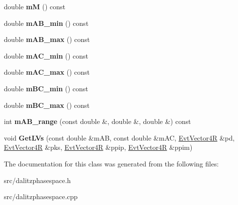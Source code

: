 \begin{DoxyCompactItemize}
\item 
\hypertarget{class_dalitz_phase_space_a0215d24ab200f3c2363610f3d63f05c8}{}double {\bfseries m\+M} () const \label{class_dalitz_phase_space_a0215d24ab200f3c2363610f3d63f05c8}

\item 
\hypertarget{class_dalitz_phase_space_af485aa6eb857562c196c0e4fa8a079fc}{}double {\bfseries m\+A\+B\+\_\+min} () const \label{class_dalitz_phase_space_af485aa6eb857562c196c0e4fa8a079fc}

\item 
\hypertarget{class_dalitz_phase_space_aa42739ae0b06d176a7b50a183da1ccc3}{}double {\bfseries m\+A\+B\+\_\+max} () const \label{class_dalitz_phase_space_aa42739ae0b06d176a7b50a183da1ccc3}

\item 
\hypertarget{class_dalitz_phase_space_a0fa5183d3bb816f7e1fcc88e250af2e6}{}double {\bfseries m\+A\+C\+\_\+min} () const \label{class_dalitz_phase_space_a0fa5183d3bb816f7e1fcc88e250af2e6}

\item 
\hypertarget{class_dalitz_phase_space_a94ab5f0e70424deeebb6abcf90ef5410}{}double {\bfseries m\+A\+C\+\_\+max} () const \label{class_dalitz_phase_space_a94ab5f0e70424deeebb6abcf90ef5410}

\item 
\hypertarget{class_dalitz_phase_space_a9f5799fca694bdb165e1bf2588e06b69}{}double {\bfseries m\+B\+C\+\_\+min} () const \label{class_dalitz_phase_space_a9f5799fca694bdb165e1bf2588e06b69}

\item 
\hypertarget{class_dalitz_phase_space_ab744b5d45f3d3f0235fc2edce690fad6}{}double {\bfseries m\+B\+C\+\_\+max} () const \label{class_dalitz_phase_space_ab744b5d45f3d3f0235fc2edce690fad6}

\item 
\hypertarget{class_dalitz_phase_space_ae9e9b117030d7eca0551c214c761aaf3}{}int {\bfseries m\+A\+B\+\_\+range} (const double \&, double \&, double \&) const \label{class_dalitz_phase_space_ae9e9b117030d7eca0551c214c761aaf3}

\item 
\hypertarget{class_dalitz_phase_space_a86cfd847b2eeb2563262723bbd21392a}{}void {\bfseries Get\+L\+Vs} (const double \&m\+A\+B, const double \&m\+A\+C, \hyperlink{class_evt_vector4_r}{Evt\+Vector4\+R} \&pd, \hyperlink{class_evt_vector4_r}{Evt\+Vector4\+R} \&pks, \hyperlink{class_evt_vector4_r}{Evt\+Vector4\+R} \&ppip, \hyperlink{class_evt_vector4_r}{Evt\+Vector4\+R} \&ppim)\label{class_dalitz_phase_space_a86cfd847b2eeb2563262723bbd21392a}

\end{DoxyCompactItemize}


The documentation for this class was generated from the following files\+:\begin{DoxyCompactItemize}
\item 
src/dalitzphasespace.\+h\item 
src/dalitzphasespace.\+cpp\end{DoxyCompactItemize}
